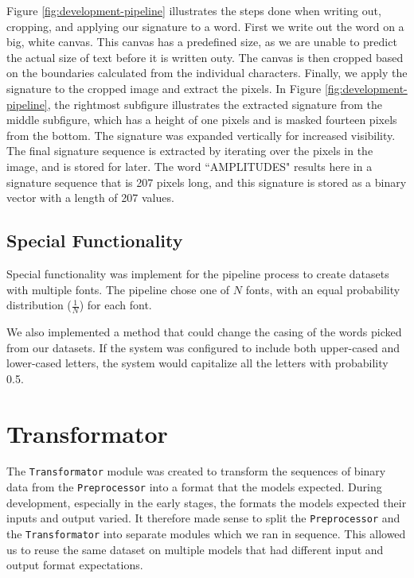 Figure \ref{fig:development-pipeline} illustrates the steps done when writing out, cropping, and applying our signature to a word. First we write out the word on a big, white canvas. This canvas has a predefined size, as we are unable to predict the actual size of text before it is written outy. The canvas is then cropped based on the boundaries calculated from the individual characters. Finally, we apply the signature to the cropped image and extract the pixels. In Figure \ref{fig:development-pipeline}, the rightmost subfigure illustrates the extracted signature from the middle subfigure, which has a height of one pixels and is masked fourteen pixels from the bottom. The signature was expanded vertically for increased visibility. The final signature sequence is extracted by iterating over the pixels in the image, and is stored for later. The word ``AMPLITUDES" results here in a signature sequence that is 207 pixels long, and this signature is stored as a binary vector with a length of 207 values.

\subsection{Special Functionality}
Special functionality was implement for the pipeline process to create datasets with multiple fonts. The pipeline chose one of \(N\) fonts, with an equal probability distribution (\(\frac{1}{N}\)) for each font.

We also implemented a method that could change the casing of the words picked from our datasets. If the system was configured to include both upper-cased and lower-cased letters, the system would capitalize all the letters with probability 0.5.


\section{Transformator}
\label{sec:transformator}
The {\tt Transformator} module was created to transform the sequences of binary data from the {\tt Preprocessor} into a format that the models expected. During development, especially in the early stages, the formats the models expected their inputs and output varied. It therefore made sense to split the {\tt Preprocessor} and the {\tt Transformator} into separate modules which we ran in sequence. This allowed us to reuse the same dataset on multiple models that had different input and output format expectations.

